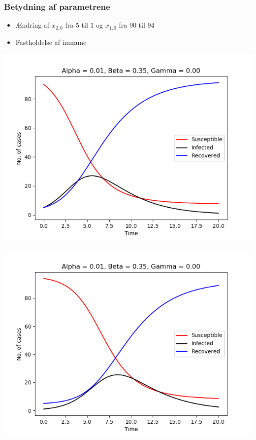 %
\begin{frame}
\frametitle{Betydning af parametrene}
\begin{itemize}
\item Ændring af $x_{2,0}$ fra $5$ til $1$ og $x_{1,0}$ fra $90$ til $94$
\item Fastholdelse af immune
\end{itemize}

\begin{minipage}{0.49\textwidth}
\includegraphics[scale=0.3]{fig/img/t_a1_b35_g0.png}
\end{minipage}
%
\begin{minipage}{0.49\textwidth}
\includegraphics[scale=0.3]{fig/img/t_x1_1_x2_94.png}
\end{minipage}
\end{frame}